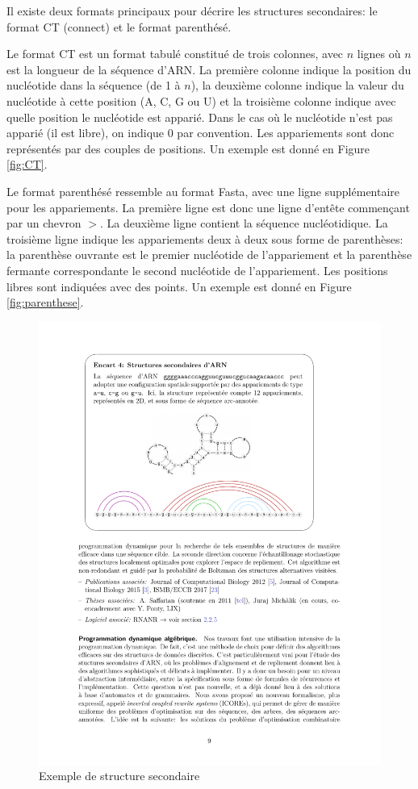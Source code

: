 \documentclass[10pt]{article}
\begin{document}
Il existe deux formats principaux pour décrire les structures secondaires: le format CT (connect) et le format parenthésé. 

Le format CT est un format tabulé constitué de trois colonnes, avec $n$ lignes où $n$ est la longueur de la séquence d'ARN. La première colonne indique la position du nucléotide dans la séquence (de 1 à $n$), la deuxième colonne indique la valeur du nucléotide à cette position (A, C, G ou U) et la troisième colonne indique avec quelle position le nucléotide est apparié. Dans le cas où le nucléotide n'est pas apparié (il est libre),  on indique 0 par convention. Les appariements sont donc représentés par des couples de positions. Un exemple est donné en Figure \ref{fig:CT}.

Le format parenthésé ressemble au format Fasta, avec une ligne supplémentaire pour les appariements. La première ligne est donc une ligne d'entête commençant par un chevron $>$. La deuxième ligne contient la séquence nucléotidique. La troisième ligne indique les appariements deux à deux sous forme de parenthèses: la parenthèse ouvrante est le premier nucléotide de l'appariement et la parenthèse fermante correspondante le second nucléotide de l'appariement. Les positions libres sont indiquées avec des points. Un exemple est donné en Figure \ref{fig:parenthese}.

\begin{figure}
\includegraphics[width=\textwidth]{structure_secondaire_ARN.pdf}
\caption{Exemple de structure secondaire}
\label{fig:arn}
\end{figure}
\end{document}
